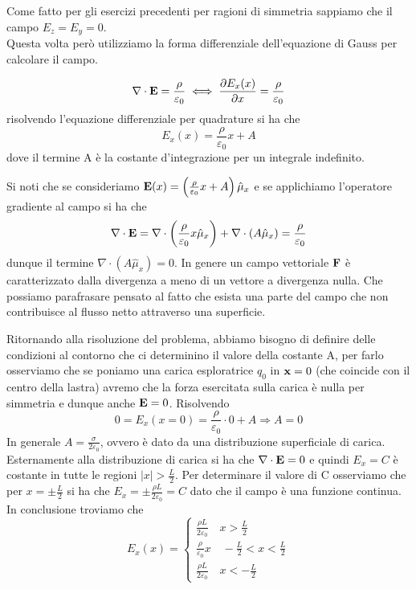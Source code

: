 \noindent Come fatto per gli esercizi precedenti per ragioni di simmetria sappiamo che il campo $E_z = E_y = 0$.
\\ Questa volta per\`o utilizziamo la forma differenziale dell'equazione di Gauss per calcolare il campo.

\begin{equation*}
	\nabla \cdot \bold{E} = \frac{\rho}{\varepsilon_0} \iff \frac{\partial E_x(x)}{\partial x} = \frac{\rho}{\varepsilon_0}
\end{equation*}
risolvendo l'equazione differenziale per quadrature si ha che 
\begin{equation*}
	E_x(x) = \frac{\rho}{\varepsilon_0}x + A
\end{equation*}
dove il termine A \`e la costante d'integrazione per un integrale indefinito.
\begin{remark}
Si noti che se consideriamo $\bold{E}(x) = \left ( \frac{\rho}{\varepsilon_0}x+A \right ) \hat{\mu}_{x}$	 e se applichiamo l'operatore gradiente al campo si ha che 
\begin{equation*}
	\nabla \cdot \bold{E} = \nabla \cdot \left ( \frac{\rho}{\varepsilon_0}x \hat{\mu}_{x}\right) + \nabla \cdot (A \hat{\mu}_x) = \frac{\rho}{\varepsilon_0} 
\end{equation*}
dunque il termine $\nabla \cdot (A \hat{\mu}_x) = 0$. In genere un campo vettoriale $\bold{F}$ \`e caratterizzato dalla divergenza a meno di un vettore a divergenza nulla. Che possiamo parafrasare pensato al fatto che esista una parte del campo che non contribuisce al flusso netto attraverso una superficie.
\end{remark}
Ritornando alla risoluzione del problema, abbiamo bisogno di definire delle condizioni al contorno che ci determinino il valore della costante A, per farlo osserviamo che se poniamo una carica esploratrice $q_0$ in $\bold{x} = 0$ (che coincide con il centro della lastra) avremo che la forza esercitata sulla carica \`e nulla per simmetria e dunque anche $\bold{E} = 0$. Risolvendo
\begin{equation*}
	0 =E_x(x=0) = \frac{\rho}{\varepsilon_0} \cdot 0 + A \Rightarrow A =0
\end{equation*}
In generale $A = \frac{\sigma}{2 \varepsilon_0}$, ovvero \`e dato da una distribuzione superficiale di carica.
Esternamente alla distribuzione di carica si ha che $\nabla \cdot \bold{E} = 0$ e quindi 
$ E_x = C$ \`e costante in tutte le regioni $|x| > \frac{L}{2}$. Per determinare il valore di C osserviamo che per $x = \pm \frac{L}{2}$ si ha che $E_x = \pm \frac{\rho L}{2\varepsilon_0} = C$
dato che il campo \`e una funzione continua. In conclusione troviamo che 
\begin{equation*}
	E_x(x) = \left \{ \begin{array}{l}
		\frac{\rho L}{2 \varepsilon_0} \quad x > \frac{L}{2}\\
		\frac{\rho }{\varepsilon_0}x \quad -\frac{L}{2} < x < \frac{L}{2}\\
		\frac{\rho L}{2 \varepsilon_0} \quad x < -\frac{L}{2}
	\end{array}\right.
\end{equation*} 

